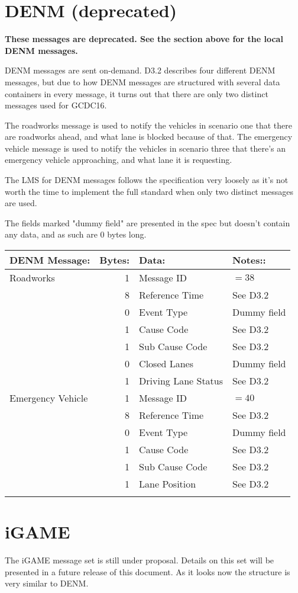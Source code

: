 \documentclass[11pt]{article}
\begin{document}
\section{DENM (deprecated)}
\label{sec:orgheadline4}
\textbf{These messages are deprecated. See the section above for the local}
\textbf{DENM messages.}

DENM messages are sent on-demand. D3.2 describes four different DENM
messages, but due to how DENM messages are structured with several
data containers in every message, it turns out that there are only two
distinct messages used for GCDC16.

The roadworks message is used to notify the vehicles in scenario one that
there are roadworks ahead, and what lane is blocked because of that.
The emergency vehicle message is used to notify the vehicles in scenario three
that there's an emergency vehicle approaching, and what lane it is
requesting.

The LMS for DENM messages follows the specification very loosely as
it's not worth the time to implement the full standard when only two
distinct messages are used. 

The fields marked "dummy field" are presented in the spec but doesn't
contain any data, and as such are 0 bytes long.

\begin{center}
\begin{tabular}{lrll}
\hline
DENM Message: & Bytes: & Data: & Notes::\\
\hline
Roadworks & 1 & Message ID & \(=38\)\\
 & 8 & Reference Time & See D3.2\\
 & 0 & Event Type & Dummy field\\
 & 1 & Cause Code & See D3.2\\
 & 1 & Sub Cause Code & See D3.2\\
 & 0 & Closed Lanes & Dummy field\\
 & 1 & Driving Lane Status & See D3.2\\
\hline
Emergency Vehicle & 1 & Message ID & \(=40\)\\
 & 8 & Reference Time & See D3.2\\
 & 0 & Event Type & Dummy field\\
 & 1 & Cause Code & See D3.2\\
 & 1 & Sub Cause Code & See D3.2\\
 & 1 & Lane Position & See D3.2\\
 &  &  & \\
\end{tabular}
\end{center}


\newpage

\section{iGAME}
\label{sec:orgheadline5}
The iGAME message set is still under proposal. Details on this set
will be presented in a future release of this document. As it looks
now the structure is very similar to DENM.
\end{document}
